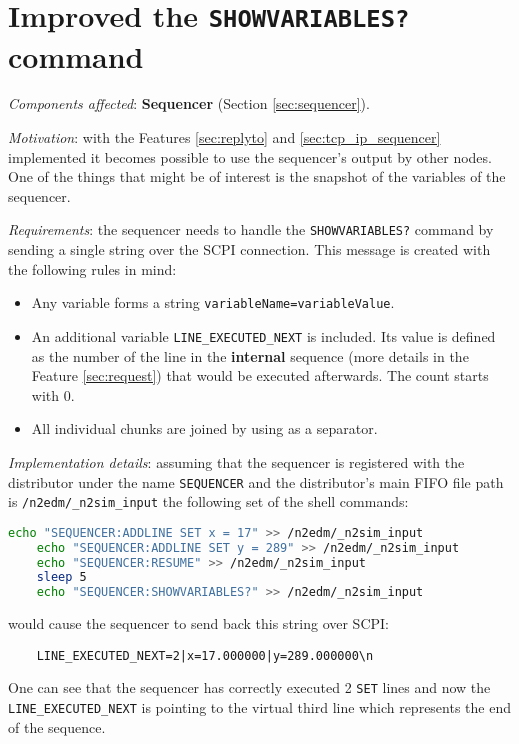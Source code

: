\section{Improved the \texttt{SHOWVARIABLES?} command}
\label{sec:showvariables}

\textit{Components affected}: \textbf{Sequencer} (Section \ref{sec:sequencer}).

\textit{Motivation}: with the Features \ref{sec:replyto} and \ref{sec:tcp_ip_sequencer} implemented it becomes possible to use the sequencer's output by other nodes. One of the things that might be of interest is the snapshot of the variables of the sequencer.

\textit{Requirements}: the sequencer needs to handle the \texttt{SHOWVARIABLES?} command by sending a single string over the SCPI connection. This message is created with the following rules in mind:

\begin{itemize}
	\item Any variable forms a string \texttt{variableName=variableValue}.
	\item An additional variable \texttt{LINE\_EXECUTED\_NEXT} is included. Its value is defined as the number of the line in the \textbf{internal} sequence (more details in the Feature \ref{sec:request}) that would be executed afterwards. The count starts with 0.
	\item All individual chunks are joined by using \highlight{|} as a separator.
\end{itemize}

\textit{Implementation details}: assuming that the sequencer is registered with the distributor under the name \texttt{SEQUENCER} and the distributor's main FIFO file path is \texttt{/n2edm/\_n2sim\_input} the following set of the shell commands:

\begin{lstlisting}[language=bash]
	echo "SEQUENCER:ADDLINE SET x = 17" >> /n2edm/_n2sim_input
	echo "SEQUENCER:ADDLINE SET y = 289" >> /n2edm/_n2sim_input
	echo "SEQUENCER:RESUME" >> /n2edm/_n2sim_input
	sleep 5
	echo "SEQUENCER:SHOWVARIABLES?" >> /n2edm/_n2sim_input
\end{lstlisting}

would cause the sequencer to send back this string over SCPI:

\begin{verbatim}
	LINE_EXECUTED_NEXT=2|x=17.000000|y=289.000000\n
\end{verbatim}

One can see that the sequencer has correctly executed 2 \texttt{SET} lines and now the \texttt{LINE\_EXECUTED\_NEXT} is pointing to the virtual third line which represents the end of the sequence.